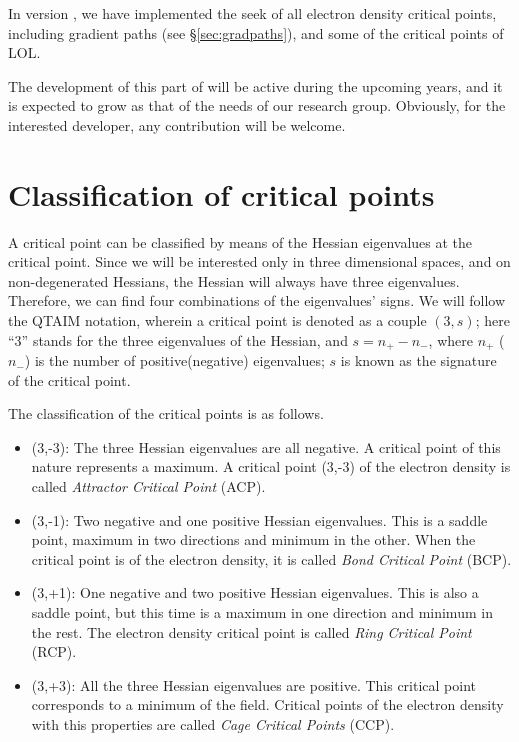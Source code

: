 In version \dtkversion, we have implemented the seek of all electron density critical points, including gradient paths (see \S\ref{sec:gradpaths}), and some of the critical points of LOL.

The development of this part of \DTK{} will be active during the upcoming years, and it is expected to grow as that of the needs of our research group. Obviously, for the interested developer, any contribution
will be welcome.

\section{Classification of critical points}

A critical point can be classified by means of the Hessian eigenvalues at the critical point.
Since we will be interested only in three dimensional spaces, and on non-degenerated Hessians,
the Hessian will always have three eigenvalues. Therefore, we can find four combinations of
the eigenvalues' signs. We will follow the QTAIM notation, wherein a critical point is
denoted as a couple $(3,s)$; here ``3'' stands for the three eigenvalues of the Hessian, and
$s=n_+-n_-$, where $n_+$ ($n_-$) is the number of positive(negative) eigenvalues; $s$ is
known as the signature of the critical point.

The classification of the critical points is as follows.
\begin{itemize}
   \item (3,-3): The three Hessian eigenvalues are all negative. A critical point of this nature represents a maximum. A critical point (3,-3) of the electron density is called \textit{Attractor Critical Point} (ACP).
   \item (3,-1): Two negative and one positive Hessian eigenvalues. This is a saddle point, maximum in two directions and minimum in the other. When the critical point is of the electron density, it is called \textit{Bond Critical Point} (BCP).
   \item (3,+1): One negative and two positive Hessian eigenvalues. This is also a saddle point, but this time is a maximum in one direction and minimum in the rest. The electron density critical point is called \textit{Ring Critical Point} (RCP).
   \item (3,+3): All the three Hessian eigenvalues are positive. This critical point corresponds to a minimum of the field. Critical points of the electron density with this properties are called \textit{Cage Critical Points} (CCP).
\end{itemize}

